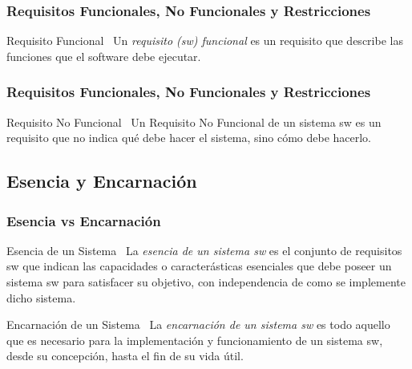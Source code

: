 \documentclass[handout,a4paper,slidestop,xcolor=pst,dvips,blue]{beamer}
\begin{document}
\begin{frame}
    \frametitle{Requisitos Funcionales, No Funcionales y Restricciones}
    \begin{block}{Requisito Funcional~\cite{ieee:swebok}}
        Un \alert{\emph{requisito (sw) funcional}} es un requisito que describe las funciones que el software debe ejecutar.
    \end{block}
\end{frame}

\begin{frame}
    \frametitle{Requisitos Funcionales, No Funcionales y Restricciones}
    \begin{block}{Requisito No Funcional~\cite{chung:1999}}
        Un \alert{Requisito No Funcional} de un sistema sw es un requisito que no indica qué debe hacer el sistema, sino cómo debe hacerlo.
    \end{block}
\end{frame}

\subsection{Esencia y Encarnación}

\begin{frame}
    \frametitle{Esencia vs Encarnación}
    \begin{block}{Esencia de un Sistema~\cite{mcmenamin:1984}}
        La \alert{\emph{esencia de un sistema sw}} es el conjunto de requisitos sw que indican las capacidades o caracterásticas esenciales  que debe poseer un sistema sw para satisfacer su objetivo, con independencia de como se implemente dicho sistema.
    \end{block}
     {
        \begin{block}{Encarnación de un Sistema~\cite{mcmenamin:1984}}
            La \alert{\emph{encarnación de un sistema sw}} es todo aquello que es necesario para la implementación y funcionamiento de un sistema sw, desde su concepción, hasta el fin de su vida útil.
        \end{block}
    }
\end{frame}
\end{document}
